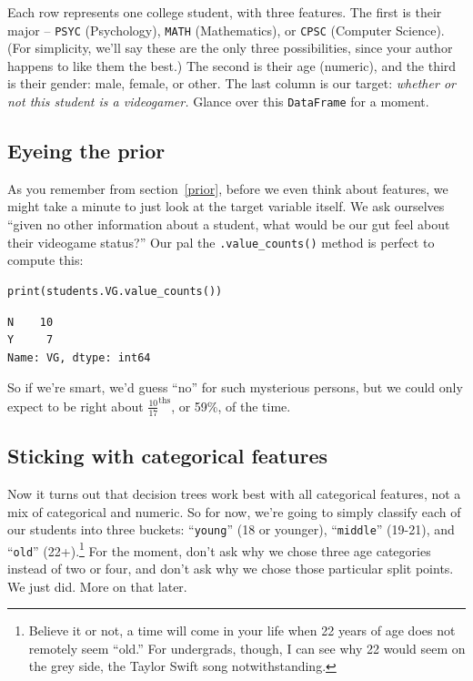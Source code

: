 
Each row represents one college student, with three features. The first is
their major -- \texttt{PSYC} (Psychology), \texttt{MATH} (Mathematics), or
\texttt{CPSC} (Computer Science). (For simplicity, we'll say these are the only
three possibilities, since your author happens to like them the best.) The
second is their age (numeric), and the third is their gender: male, female, or
other. The last column is our target: \textit{whether or not this student is a
videogamer.} Glance over this \texttt{DataFrame} for a moment.

\subsection{Eyeing the prior}


As you remember from section~\ref{prior}, before we even think about features,
we might take a minute to just look at the target variable itself. We ask
ourselves ``given no other information about a student, what would be our gut
feel about their videogame status?'' Our pal the \texttt{.value\_counts()}
method is perfect to compute this:

\begin{Verbatim}[fontsize=\small,samepage=true,frame=single,framesep=3mm]
print(students.VG.value_counts())
\end{Verbatim}
\vspace{-.2in}

\begin{Verbatim}[fontsize=\small,samepage=true,frame=leftline,framesep=5mm,framerule=1mm]
N    10
Y     7
Name: VG, dtype: int64
\end{Verbatim}

So if we're smart, we'd guess ``no'' for such mysterious persons, but we could
only expect to be right about $\frac{10}{17}^\textrm{ths}$, or 59\%, of the
time.

\subsection{Sticking with categorical features}


Now it turns out that decision trees work best with all categorical features,
not a mix of categorical and numeric. So for now, we're going to simply
classify each of our students into three buckets: ``\texttt{young}'' (18 or
younger), ``\texttt{middle}'' (19-21), and ``\texttt{old}''
(22+).\footnote{ Believe it or not, a time will come in
your life when 22 years of age does not remotely seem ``old.'' For undergrads,
though, I can see why 22 would seem on the grey side, the Taylor Swift song
notwithstanding.} For the moment, don't ask why we chose three age categories
instead of two or four, and don't ask why we chose those particular split
points. We just did. More on that later.

